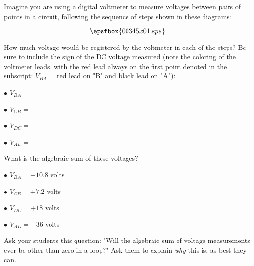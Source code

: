 

Imagine you are using a digital voltmeter to measure voltages between pairs of points in a circuit, following the sequence of steps shown in these diagrams:

$$\epsfbox{00345x01.eps}$$

How much voltage would be registered by the voltmeter in each of the steps?  Be sure to include the sign of the DC voltage measured (note the coloring of the voltmeter leads, with the red lead always on the first point denoted in the subscript: $V_{BA}$ = red lead on "B" and black lead on "A"):

\medskip
\item{$\bullet$} $V_{BA} = $
\item{$\bullet$} $V_{CB} = $
\item{$\bullet$} $V_{DC} = $
\item{$\bullet$} $V_{AD} = $
\medskip

What is the algebraic sum of these voltages?







\medskip
\item{$\bullet$} $V_{BA} = +10.8$ volts
\item{$\bullet$} $V_{CB} = +7.2$ volts
\item{$\bullet$} $V_{DC} = +18$ volts 
\item{$\bullet$} $V_{AD} = -36$ volts
\medskip







Ask your students this question: "Will the algebraic sum of voltage measurements ever be other than zero in a loop?"  Ask them to explain {\it why} this is, as best they can.




